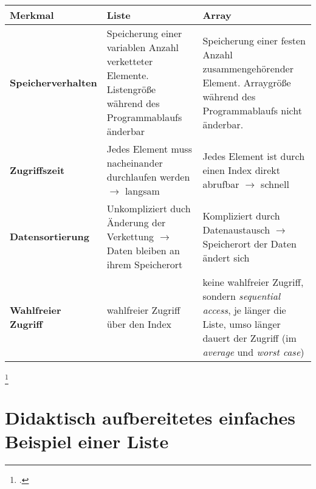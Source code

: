 \documentclass{bschlangaul-theorie}
\begin{document}
\begin{tabularx}{\linewidth}{|l|X|X|}

\hline
%

\textbf{Merkmal} & \textbf{Liste} & \textbf{Array}
\\
\hline\hline

%

\textbf{Speicherverhalten} &

Speicherung einer variablen Anzahl verketteter Elemente. Listengröße
während des Programmablaufs änderbar &

Speicherung einer festen Anzahl zusammengehörender Element. Arraygröße
während des Programmablaufs nicht änderbar.

\\
\hline

%

\textbf{Zugriffszeit} &

Jedes Element muss nacheinander durchlaufen werden $\rightarrow$ langsam
&

Jedes Element ist durch einen Index direkt abrufbar $\rightarrow$
schnell

\\
\hline

%

\textbf{Datensortierung} &

Unkompliziert duch Änderung der Verkettung $\rightarrow$
Daten bleiben an ihrem Speicherort &

Kompliziert durch Datenaustausch $\rightarrow$
Speicherort der Daten ändert sich

\\
\hline

\textbf{Wahlfreier Zugriff} &

wahlfreier Zugriff über den Index &

keine wahlfreier Zugriff, sondern \emph{sequential access}, je länger
die Liste, umso länger dauert der Zugriff (im \emph{average} und
\emph{worst case})

\end{tabularx}
\footcite[Seite 8]{aud:fs:4}

%

\section{Didaktisch aufbereitetes einfaches Beispiel einer Liste}
\end{document}
